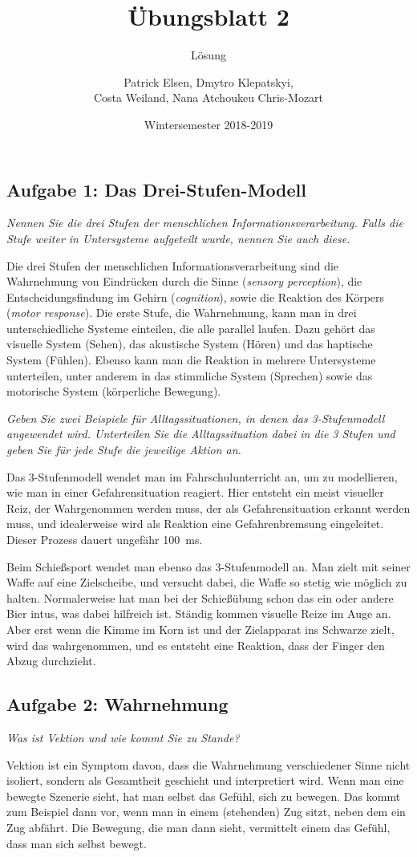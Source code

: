 \documentclass[
  ngerman,
  DIV=14
]{scrartcl}
\title{Übungsblatt 2}
\subtitle{Lösung}
\author{Patrick Elsen, Dmytro Klepatskyi,\\Costa Weiland, Nana Atchoukeu Chris-Mozart}
\date{Wintersemester 2018-2019}
\begin{document}
\maketitle

\subsection*{Aufgabe 1: Das Drei-Stufen-Modell}
\emph{Nennen Sie die drei Stufen der menschlichen Informationsverarbeitung. Falls die Stufe weiter in Untersysteme aufgeteilt wurde, nennen Sie auch diese.}
\par\medskip\noindent
Die drei Stufen der menschlichen Informationsverarbeitung sind die Wahrnehmung von Eindrücken durch die Sinne (\emph{sensory perception}), die Entscheidungsfindung im Gehirn (\emph{cognition}), sowie die Reaktion des Körpers (\emph{motor response}). Die erste Stufe, die Wahrnehmung, kann man in drei unterschiedliche Systeme einteilen, die alle parallel laufen. Dazu gehört das visuelle System (Sehen), das akustische System (Hören) und das haptische System (Fühlen). Ebenso kann man die Reaktion in mehrere Untersysteme unterteilen, unter anderem in das stimmliche System (Sprechen) sowie das motorische System (körperliche Bewegung).

\bigskip\noindent
\emph{Geben Sie zwei Beispiele für Alltagssituationen, in denen das 3-Stufenmodell angewendet wird. Unterteilen Sie die Alltagssituation dabei in die 3 Stufen und geben Sie für jede Stufe die jeweilige Aktion an.}
\par\medskip\noindent
Das 3-Stufenmodell wendet man im Fahrschulunterricht an, um zu modellieren, wie man in einer Gefahrensituation reagiert. Hier entsteht ein meist visueller Reiz, der Wahrgenommen werden muss, der als Gefahrensituation erkannt werden muss, und idealerweise wird als Reaktion eine Gefahrenbremsung eingeleitet. Dieser Prozess dauert ungefähr \SI{100}{\milli\second}.

Beim Schießsport wendet man ebenso das 3-Stufenmodell an. Man zielt mit seiner Waffe auf eine Zielscheibe, und versucht dabei, die Waffe so stetig wie möglich zu halten. Normalerweise hat man bei der Schießübung schon das ein oder andere Bier intus, was dabei hilfreich ist. Ständig kommen visuelle Reize im Auge an. Aber erst wenn die Kimme im Korn ist und der Zielapparat ins Schwarze zielt, wird das wahrgenommen, und es entsteht eine Reaktion, dass der Finger den Abzug durchzieht. 

\subsection*{Aufgabe 2: Wahrnehmung}
\emph{Was ist Vektion und wie kommt Sie zu Stande?}
\par\medskip\noindent
Vektion ist ein Symptom davon, dass die Wahrnehmung verschiedener Sinne nicht isoliert, sondern als Gesamtheit geschieht und interpretiert wird. Wenn man eine bewegte Szenerie sieht, hat man selbst das Gefühl, sich zu bewegen. Das kommt zum Beispiel dann vor, wenn man in einem (stehenden) Zug sitzt, neben dem ein Zug abfährt. Die Bewegung, die man dann sieht, vermittelt einem das Gefühl, dass man sich selbst bewegt. 
\end{document}
